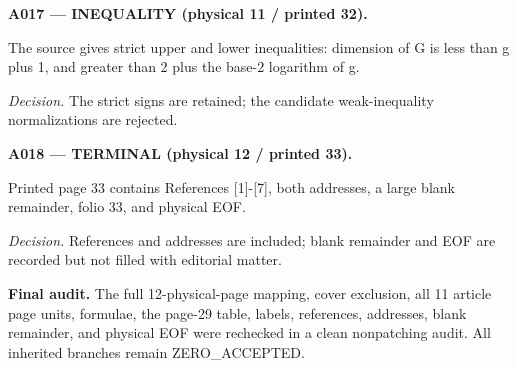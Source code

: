 \documentclass[10pt,a4paper]{article}
\begin{document}
\medskip

\noindent\textbf{A017 --- INEQUALITY (physical 11 / printed 32).}

The source gives strict upper and lower inequalities: dimension of G is less than g plus 1, and greater than 2 plus the base-2 logarithm of g.

\par\textit{Decision.} The strict signs are retained; the candidate weak-inequality normalizations are rejected.

\medskip

\noindent\textbf{A018 --- TERMINAL (physical 12 / printed 33).}

Printed page 33 contains References [1]-[7], both addresses, a large blank remainder, folio 33, and physical EOF.

\par\textit{Decision.} References and addresses are included; blank remainder and EOF are recorded but not filled with editorial matter.

\medskip

\noindent\textbf{Final audit.} The full 12-physical-page mapping, cover exclusion, all 11 article page units, formulae, the page-29 table, labels, references, addresses, blank remainder, and physical EOF were rechecked in a clean nonpatching audit. All inherited branches remain ZERO\_ACCEPTED.
\end{document}
